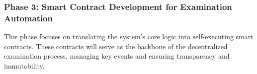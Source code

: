 \documentclass[12pt,a4paper]{article}
\begin{document}




\subsubsection{Phase 3: Smart Contract Development for Examination Automation}

This phase focuses on translating the system's core logic into self-executing smart contracts. These contracts will serve as the backbone of the decentralized examination process, managing key events and ensuring transparency and immutability.
\end{document}
